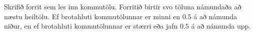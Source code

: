 \begin{problem}
	Skrifið forrit sem les inn kommutölu. Forritið birtir svo töluna námundaða að næstu heiltölu. Ef brotahluti kommutölunnar er minni en $0.5$ á að námunda niður, en ef brotahluti kommutölunnar er stærri eða jafn $0.5$ á að námunda upp.

\begin{example}
%
\end{example}
\begin{example}
%
\end{example}
\begin{example}
%
\end{example}
\begin{example}
%
\end{example}
\end{problem}